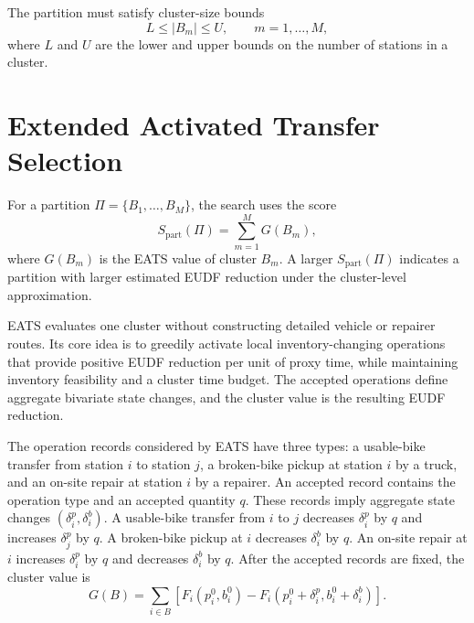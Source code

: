 The partition must satisfy cluster-size bounds
\begin{equation}
L\le |B_m|\le U,
\qquad m=1,\ldots,M,
\label{ch5:eq:partition-size-bounds}
\end{equation}
where $L$ and $U$ are the lower and upper bounds on the number of stations in a
cluster.


\section{Extended Activated Transfer Selection}\label{ch5:sec:eats}\label{ch5:sec:hgs-euc-evaluation}

For a partition $\Pi=\{B_1,\ldots,B_M\}$, the search uses the score
\begin{equation}
S_{\mathrm{part}}(\Pi)=\sum_{m=1}^{M}G(B_m),
\label{ch5:eq:partition-score}
\end{equation}
where $G(B_m)$ is the EATS value of cluster $B_m$. A larger
$S_{\mathrm{part}}(\Pi)$ indicates a partition with larger estimated EUDF
reduction under the cluster-level approximation.

EATS evaluates one cluster without constructing detailed vehicle or repairer
routes. Its core idea is to greedily activate local inventory-changing operations
that provide positive EUDF reduction per unit of proxy time, while maintaining
inventory feasibility and a cluster time budget. The accepted operations define
aggregate bivariate state changes, and the cluster value is the resulting EUDF
reduction.

The operation records considered by EATS have three types: a usable-bike transfer
from station $i$ to station $j$, a broken-bike pickup at station $i$ by a truck,
and an on-site repair at station $i$ by a repairer. An accepted record contains
the operation type and an accepted quantity $q$. These records imply aggregate
state changes $(\delta_i^p,\delta_i^b)$. A usable-bike transfer from $i$ to $j$
decreases $\delta_i^p$ by $q$ and increases $\delta_j^p$ by $q$. A broken-bike
pickup at $i$ decreases $\delta_i^b$ by $q$. An on-site repair at $i$ increases
$\delta_i^p$ by $q$ and decreases $\delta_i^b$ by $q$. After the accepted records
are fixed, the cluster value is
\begin{equation}
G(B)=
\sum_{i\in B}
\left[
F_i(p_i^0,b_i^0)
-F_i(p_i^0+\delta_i^p,b_i^0+\delta_i^b)
\right].
\label{ch5:eq:cluster-eats-value}
\end{equation}

